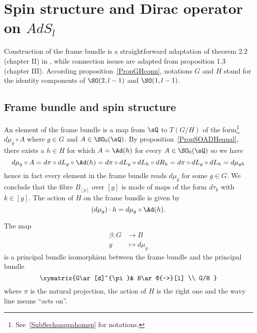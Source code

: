 \section{Spin structure and Dirac operator on \texorpdfstring{$AdS_{l}$}{AdSl}}\label{SecDirADs}

Construction of the frame bundle is a straightforward adaptation of theorem 2.2 (chapter II) in \cite{AnnikFranc}, while connection issues are adapted from proposition 1.3 (chapter III).  According proposition~\ref{PropGHconn}, notations $G$ and $H$ stand for the identity components of $\SO(2,l-1)$ and $\SO(1,l-1)$.

\subsection{Frame bundle and spin structure}

An element of the frame bundle is a map from $\sQ$ to $T(G/H)$ of the form\footnote{See~\ref{SubSechoappahomsp} for notations.} $d\mu_g\circ A$ where $g\in G$ and $A\in \SO_0(\sQ)$. By proposition~\ref{PropSOADHequal}, there exists a $h\in H$ for which $A=\Ad(h)$ for every $A\in\SO_0(\sQ)$ so we have
\[
 d\mu_g\circ A=d\pi\circ dL_g\circ\Ad(h)=d\pi\circ dL_g \circ dL_h\circ dR_h=d\pi\circ dL_g \circ dL_h=d\mu_{gh}
\]
hence in fact every element in the frame bundle reads $d\mu_g$ for some $g\in G$. We conclude that the fibre $B_{[g]}$ over $[g]$ is made of maps of the form $d\tau_k$ with $k\in[g]$. The action of $H$ on the frame bundle is given by
\[
  (d\mu_g)\cdot h=d\mu_g\circ\Ad(h).
\]

\begin{proposition}
The map
\begin{equation}
\begin{aligned}
 \beta\colon G&\to B \\
g&\mapsto d\mu_g
\end{aligned}
\end{equation}
is a principal bundle isomorphism between the frame bundle and the principal bundle
\begin{equation}        \label{PrincHGGH}
\xymatrix{%
    G\ar[d]^{\pi}& H\ar@{~>}[l]     \\
                    G/H
 }
\end{equation}
where $\pi$ is the natural projection, the action of $H$ is the right one and the wavy line means ``acts on''.
\end{proposition}

